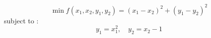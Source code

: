 $$\min f(x_1, x_2, y_1, y_2) = (x_1- x_2)^2 + (y_1 - y_2)^2$$
subject to : $$y_1 = x_1^2, \quad y_2 = x_2-1$$